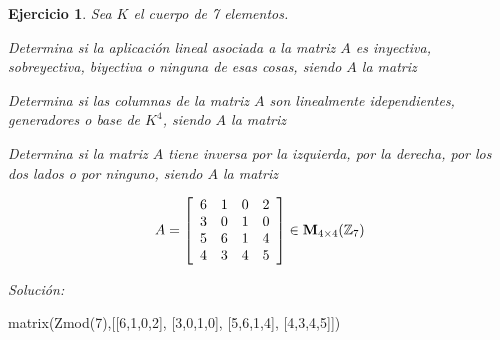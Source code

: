 \documentclass[12pt]{amsart}
\newtheorem{ejer}{Ejercicio}
\begin{document}
\begin{ejer} Sea $K$ el cuerpo de 7 elementos.
\newline
\noindent\begin{minipage}{\textwidth}
\begin{tcolorbox}[colback = green!20!white,title=Versión Aplicaciones]
Determina si la aplicaci\'on lineal asociada a la matriz $A$ es inyectiva, sobreyectiva, biyectiva o ninguna de esas cosas, siendo $A$ la matriz \end{tcolorbox}
\end{minipage} \newline
\noindent\begin{minipage}{\textwidth}
\begin{tcolorbox}[colback = blue!20!white,title=Versión Vectores]
Determina si las columnas de la matriz $A$ son linealmente idependientes, generadores o base de $K^{4}$, siendo $A$ la matriz \end{tcolorbox}
\end{minipage} \newline
\noindent\begin{minipage}{\textwidth} 
\begin{tcolorbox}[colback = red!20!white,title=Versión Inversas]
Determina si la matriz $A$ tiene inversa por la izquierda, por la derecha, por los dos lados o por ninguno, siendo $A$ la matriz 
\end{tcolorbox}
\end{minipage}
\[ A = \left[\begin{array}{rrrr}
6 & 1 & 0 & 2 \\
3 & 0 & 1 & 0 \\
5 & 6 & 1 & 4 \\
4 & 3 & 4 & 5
\end{array}\right] \in {\bf M}_{4\times 4}({\mathbb Z}_{7})\]
\end{ejer}

{\it Soluci\'on:}

\begin{sageblock}
matrix(Zmod(7),[[6,1,0,2],
[3,0,1,0],
[5,6,1,4],
[4,3,4,5]])
\end{sageblock}

\end{document}
